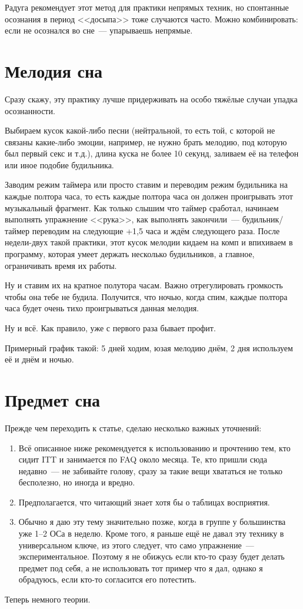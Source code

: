 \documentclass[a4paper,14pt,oneside]{memoir}
\begin{document}
Радуга рекомендует этот метод для практики непрямых техник, но спонтанные осознания в период <<досыпа>> тоже случаются часто. Можно комбинировать: если не осознался во сне~--- упарываешь непрямые.




\chapter{Мелодия сна} 
Сразу скажу, эту практику лучше придерживать на особо тяжёлые случаи упадка осознанности. 

Выбираем кусок какой-либо песни (нейтральной, то есть той, с которой не связаны какие-либо эмоции, например, не нужно брать мелодию, под которую был первый секс и т.д.), длина куска не более 10 секунд, заливаем её на телефон или иное подобие будильника.
 
Заводим режим таймера или просто ставим и переводим режим будильника на каждые полтора часа, то есть каждые полтора часа он должен проигрывать этот музыкальный фрагмент. Как только слышим что таймер сработал, начинаем выполнять упражнение <<рука>>, как выполнять закончили~--- бу\-диль\-ник/тай\-мер переводим на следующие +1,5 часа и ждём следующего раза. После недели-двух такой практики, этот кусок мелодии кидаем на комп и впихиваем в программу, которая умеет держать несколько будильников, а главное, ограничивать время их работы. 

Ну и ставим их на кратное полутора часам. Важно отрегулировать громкость чтобы она тебе не будила. Получится, что ночью, когда спим, каждые полтора часа будет очень тихо проигрываться данная мелодия. 

Ну и всё. Как правило, уже с первого раза бывает профит.
 
Примерный график такой: 5 дней ходим, юзая мелодию днём, 2 дня используем её и днём и ночью. 



\chapter{Предмет сна}
Прежде чем переходить к статье, сделаю несколько важных уточнений:
\begin{enumerate}
\item Всё описанное ниже рекомендуется к использованию и прочтению тем, кто сидит ITT и занимается по FAQ около месяца. Те, кто пришли сюда недавно~--- не забивайте голову, сразу за такие вещи хвататься не только бесполезно, но иногда и вредно. 
\item Предполагается, что читающий знает хотя бы о таблицах восприятия.
\item Обычно я даю эту тему значительно позже, когда в группе у большинства уже 1--2 ОСа в неделю. Кроме того, я раньше ещё не давал эту технику в универсальном ключе, из этого следует, что само упражнение~--- экспериментальное. Поэтому я не обижусь если кто-то сразу будет делать предмет под себя, а не использовать тот пример что я дал, однако я обрадуюсь, если кто-то согласится его потестить.
\end{enumerate}
\smallskip
Теперь немного теории.
 
\end{document}
